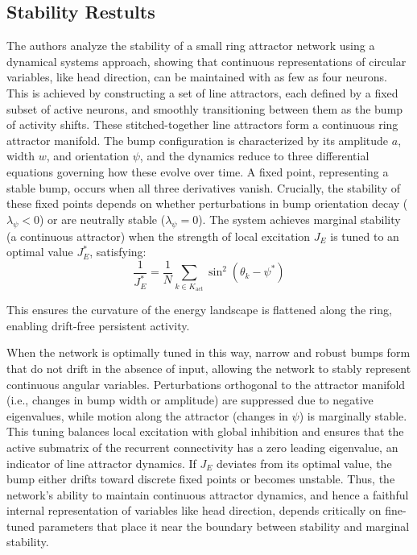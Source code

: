 \documentclass[11pt,a4paper]{article}
\begin{document}
\subsection{Stability Restults}

The authors analyze the stability of a small ring attractor network using a dynamical systems approach, showing that continuous representations of circular variables, like head direction, can be maintained with as few as four neurons. This is achieved by constructing a set of line attractors, each defined by a fixed subset of active neurons, and smoothly transitioning between them as the bump of activity shifts. These stitched-together line attractors form a continuous ring attractor manifold. The bump configuration is characterized by its amplitude \( a \), width \( w \), and orientation \( \psi \), and the dynamics reduce to three differential equations governing how these evolve over time. A fixed point, representing a stable bump, occurs when all three derivatives vanish. Crucially, the stability of these fixed points depends on whether perturbations in bump orientation decay (\( \lambda_\psi < 0 \)) or are neutrally stable (\( \lambda_\psi = 0 \)). The system achieves marginal stability (a continuous attractor) when the strength of local excitation \( J_E \) is tuned to an optimal value \( J_E^* \), satisfying:
\begin{equation}
\frac{1}{J_E^*} = \frac{1}{N} \sum_{k \in K_{\text{act}}} \sin^2(\theta_k - \psi^*)
\end{equation}

This ensures the curvature of the energy landscape is flattened along the ring, enabling drift-free persistent activity.

When the network is optimally tuned in this way, narrow and robust bumps form that do not drift in the absence of input, allowing the network to stably represent continuous angular variables. Perturbations orthogonal to the attractor manifold (i.e., changes in bump width or amplitude) are suppressed due to negative eigenvalues, while motion along the attractor (changes in \( \psi \)) is marginally stable. This tuning balances local excitation with global inhibition and ensures that the active submatrix of the recurrent connectivity has a zero leading eigenvalue, an indicator of line attractor dynamics. If \( J_E \) deviates from its optimal value, the bump either drifts toward discrete fixed points or becomes unstable. Thus, the network’s ability to maintain continuous attractor dynamics, and hence a faithful internal representation of variables like head direction, depends critically on fine-tuned parameters that place it near the boundary between stability and marginal stability.
\end{document}
